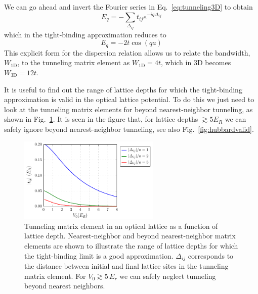 We can go ahead and invert the Fourier series in Eq.~\ref{eq:tunneling3D} to
obtain 
\begin{equation} 
  E_{q} = - \sum_{\Delta_{ij}} t_{ij} e^{-iq \Delta_{ij}} 
\end{equation}
which in the tight-binding approximation reduces to 
\begin{equation}
  E_{q} = -2 t\cos( qa) 
\end{equation}
This explicit form for the dispersion relation allows us to relate the
bandwidth, $W_{\text{1D}}$, to the tunneling matrix element as
$W_{\text{1D}}=4t$,  which in 3D becomes $W_{\text{3D}}= 12t$.

It is useful to find out the range of lattice depths for which the
tight-binding approximation is valid in the optical lattice potential.  To do
this we just need to look at the tunneling matrix elements for beyond
nearest-neighbor tunneling,  as shown in Fig.~\ref{fig:tightbinding}.  It is
seen in the figure that, for lattice depths $\gtrsim 5 E_{R}$  we can safely
ignore beyond nearest-neighbor tunneling, see also Fig.~\ref{fig:hubbardvalid}.  
\begin{figure}
\centering
\includegraphics[width=0.6\textwidth]{../figures/BandStructure_figures/tightbinding_V0_interp.pdf}
\caption[Tunneling matrix elements in a 3D lattice.]{\small Tunneling matrix
element in an optical lattice as a function of lattice depth.  Nearest-neighbor
and beyond nearest-neighbor matrix elements are shown to illustrate the range
of lattice depths for which the tight-binding limit is a good approximation.
$\Delta_{ij}$ corresponds to the distance between initial and final lattice
sites in the tunneling matrix element.  For $V_{0}\gtrsim 5\,E_{r}$ we can
safely neglect tunneling beyond nearest neighbors.  } \label{fig:tightbinding}
\end{figure}

